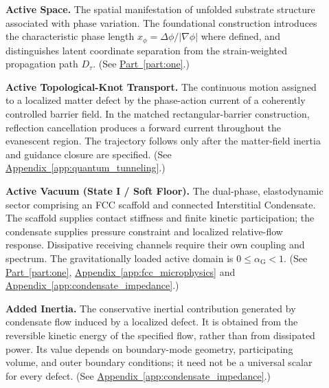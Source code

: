 \begin{description}
\item[] \begin{minipage}[t]{\linewidth}
\textbf{Active Space.} The spatial manifestation of unfolded substrate structure associated with phase variation. The foundational construction introduces the characteristic phase length $x_\phi=\Delta\phi/|\nabla\phi|$ where defined, and distinguishes latent coordinate separation from the strain-weighted propagation path $D_\tau$.
(See \hyperref[part:one]{Part~\ref*{part:one}}.)
\end{minipage}

\item[] \begin{minipage}[t]{\linewidth}
\textbf{Active Topological-Knot Transport.} The continuous motion assigned to a localized matter defect by the phase-action current of a coherently controlled barrier field. In the matched rectangular-barrier construction, reflection cancellation produces a forward current throughout the evanescent region. The trajectory follows only after the matter-field inertia and guidance closure are specified.
(See \hyperref[app:quantum_tunneling]{Appendix~\ref*{app:quantum_tunneling}}.)
\end{minipage}

\item[] \begin{minipage}[t]{\linewidth}
\textbf{Active Vacuum (State I / Soft Floor).} The dual-phase, elastodynamic sector comprising an FCC scaffold and connected Interstitial Condensate. The scaffold supplies contact stiffness and finite kinetic participation; the condensate supplies pressure constraint and localized relative-flow response. Dissipative receiving channels require their own coupling and spectrum. The gravitationally loaded active domain is $0\leq\alpha_{\mathrm G}<1$.
(See \hyperref[part:one]{Part~\ref*{part:one}}, \hyperref[app:fcc_microphysics]{Appendix~\ref*{app:fcc_microphysics}} and \hyperref[app:condensate_impedance]{Appendix~\ref*{app:condensate_impedance}}.)
\end{minipage}

\item[] \begin{minipage}[t]{\linewidth}
\textbf{Added Inertia.} The conservative inertial contribution generated by condensate flow induced by a localized defect. It is obtained from the reversible kinetic energy of the specified flow, rather than from dissipated power. Its value depends on boundary-mode geometry, participating volume, and outer boundary conditions; it need not be a universal scalar for every defect.
(See \hyperref[app:condensate_impedance]{Appendix~\ref*{app:condensate_impedance}}.)
\end{minipage}


\end{description}
